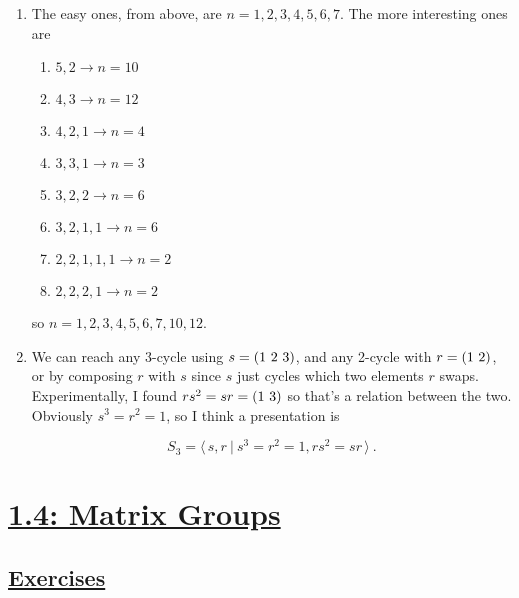 \documentclass[]{article}
\newcommand*{\cycle}[1]{( \foreach \entry [count=\i] in {#1} {\ifnum\i>1\ \fi\entry})}
\begin{document}
\begin{enumerate}
\item The easy ones, from above, are $n = 1,2,3,4,5,6,7$. The more interesting ones are
\begin{enumerate}
\item $5,2 \rightarrow n = 10$
\item $4,3 \rightarrow n = 12$
\item $4,2,1 \rightarrow n = 4$
\item $3,3,1 \rightarrow n = 3$
\item $3,2,2 \rightarrow n = 6$
\item $3,2,1,1 \rightarrow n = 6$
\item $2,2,1,1,1 \rightarrow n = 2$
\item $2,2,2,1 \rightarrow n = 2$
\end{enumerate}
so $n = 1,2,3,4,5,6,7,10,12$.


\item We can reach any 3-cycle using $s = \cycle{1,2,3}$, and any 2-cycle with $r = \cycle{1,2}$, or by composing $r$ with $s$ since $s$ just cycles which two elements $r$ swaps. Experimentally, I found $rs^2 = sr = \cycle{1,3}$ so that's a relation between the two. Obviously $s^3 = r^2 = 1$, so I think a presentation is

\begin{equation}
S_3 = \langle\, s,r\ \vert\ s^3=r^2=1, rs^2 = sr\, \rangle\ .
\end{equation}

\end{enumerate}
























\section*{\underline{1.4: Matrix Groups}}
\subsection*{\underline{Exercises}}
\end{document}
